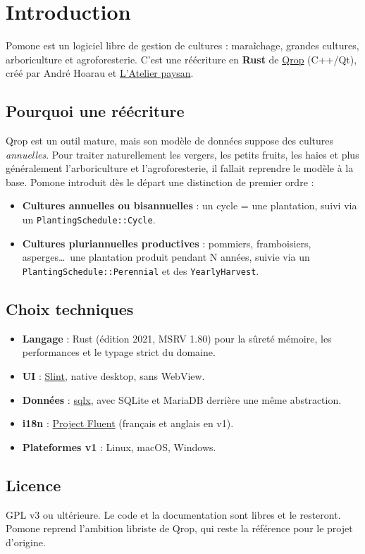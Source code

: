 \section{Introduction}

Pomone est un logiciel libre de gestion de cultures : maraîchage, grandes cultures, arboriculture et agroforesterie. C'est une réécriture en \textbf{Rust} de \href{https://qrop.readthedocs.io/}{Qrop} (C++/Qt), créé par André Hoarau et \href{https://www.latelierpaysan.org/}{L'Atelier paysan}.

\subsection{Pourquoi une réécriture}

Qrop est un outil mature, mais son modèle de données suppose des cultures \emph{annuelles}. Pour traiter naturellement les vergers, les petits fruits, les haies et plus généralement l'arboriculture et l'agroforesterie, il fallait reprendre le modèle à la base. Pomone introduit dès le départ une distinction de premier ordre :

\begin{itemize}
  \item \textbf{Cultures annuelles ou bisannuelles} : un cycle = une plantation, suivi via un \texttt{PlantingSchedule::Cycle}.
  \item \textbf{Cultures pluriannuelles productives} : pommiers, framboisiers, asperges\dots\ une plantation produit pendant N années, suivie via un \texttt{PlantingSchedule::Perennial} et des \texttt{YearlyHarvest}.
\end{itemize}

\subsection{Choix techniques}

\begin{itemize}
  \item \textbf{Langage} : Rust (édition 2021, MSRV 1.80) pour la sûreté mémoire, les performances et le typage strict du domaine.
  \item \textbf{UI} : \href{https://slint.dev/}{Slint}, native desktop, sans WebView.
  \item \textbf{Données} : \href{https://github.com/launchbadge/sqlx}{sqlx}, avec SQLite et MariaDB derrière une même abstraction.
  \item \textbf{i18n} : \href{https://projectfluent.org/}{Project Fluent} (français et anglais en v1).
  \item \textbf{Plateformes v1} : Linux, macOS, Windows.
\end{itemize}

\subsection{Licence}

GPL v3 ou ultérieure. Le code et la documentation sont libres et le resteront. Pomone reprend l'ambition libriste de Qrop, qui reste la référence pour le projet d'origine.
